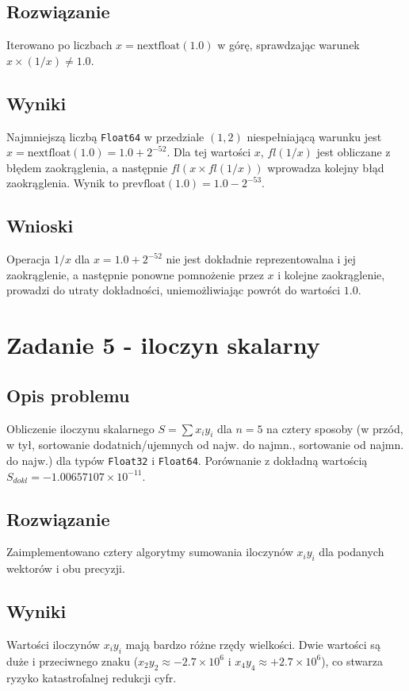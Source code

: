 \documentclass{article}
\begin{document}
\subsection{Rozwiązanie}
Iterowano po liczbach $x = \text{nextfloat}(1.0)$ w górę, sprawdzając warunek $x \times (1/x) \neq 1.0$.

\subsection{Wyniki}
Najmniejszą liczbą \texttt{Float64} w przedziale $(1, 2)$ niespełniającą warunku jest $x = \text{nextfloat}(1.0) = 1.0 + 2^{-52}$.
Dla tej wartości $x$, $fl(1/x)$ jest obliczane z błędem zaokrąglenia, a następnie $fl(x \times fl(1/x))$ wprowadza kolejny błąd zaokrąglenia. Wynik to $\text{prevfloat}(1.0) = 1.0 - 2^{-53}$.

\subsection{Wnioski}
Operacja $1/x$ dla $x = 1.0 + 2^{-52}$ nie jest dokładnie reprezentowalna i jej zaokrąglenie, a następnie ponowne pomnożenie przez $x$ i kolejne zaokrąglenie, prowadzi do utraty dokładności, uniemożliwiając powrót do wartości $1.0$.

\section{Zadanie 5 - iloczyn skalarny}
\subsection{Opis problemu}
Obliczenie iloczynu skalarnego $S = \sum x_i y_i$ dla $n=5$ na cztery sposoby (w przód, w tył, sortowanie dodatnich/ujemnych od najw. do najmn., sortowanie od najmn. do najw.) dla typów \texttt{Float32} i \texttt{Float64}. Porównanie z dokładną wartością $S_{dokl} = -1.00657107 \times 10^{-11}$.

\subsection{Rozwiązanie}
Zaimplementowano cztery algorytmy sumowania iloczynów $x_i y_i$ dla podanych wektorów i obu precyzji.

\subsection{Wyniki}
Wartości iloczynów $x_i y_i$ mają bardzo różne rzędy wielkości. Dwie wartości są duże i przeciwnego znaku ($x_2y_2 \approx -2.7 \times 10^6$ i $x_4y_4 \approx +2.7 \times 10^6$), co stwarza ryzyko katastrofalnej redukcji cyfr.
\end{document}
